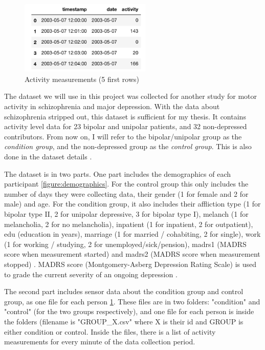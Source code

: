 \begin{figure}
    \begin{center}
        \includegraphics[height=3.5cm]{img/participant.png}
        \caption{Activity measurements (5 first rows)}
        \label{figure:participant_activity}
    \end{center}
\end{figure}

The dataset we will use in this project \cite{dataset} was collected for another study for motor activity in schizophrenia and major depression. 
With the data about schizophrenia stripped out, this dataset is sufficient for my thesis. It contains activity level data for 23 bipolar and unipolar patients, 
and 32 non-depressed contributors. From now on, I will refer to the bipolar/unipolar group as the \textit{condition group}, and the non-depressed group as 
the \textit{control group}. This is also done in the dataset details \cite{dataset_details}.

The dataset is in two parts. One part includes the demographics of each participant \ref{figure:demographics}. For the control group this only includes the number of 
days they were collecting data, their gender (1 for female and 2 for male) and age. For the condition group, it also includes their affliction type (1 for bipolar
type II, 2 for unipolar depressive, 3 for bipolar type I), melanch (1 for melancholia, 2 for no melancholia), inpatient (1 for inpatient, 2 for outpatient),
edu (education in years), marriage (1 for married / cohabiting, 2 for single), work (1 for working / studying, 2 for unemployed/sick/pension), madrs1 (MADRS score 
when measurement started) and madrs2 (MADRS score when measurement stopped) \cite{dataset_details}. MADRS score (Montgomery-Asberg Depression Rating Scale) 
is used to grade the current severity of an ongoing depression \cite{dataset_details}.

The second part includes sensor data about the condition group and control group, as one file for each person \ref{figure:participant_activity}. 
These files are in two folders: "condition" and "control" (for the two groups respectively), and one file for each person is inside the folders (filename 
is "GROUP\_X.csv" where X is their id and GROUP is either condition or control. Inside the files, there is a list of activity measurements for every 
minute of the data collection period.

